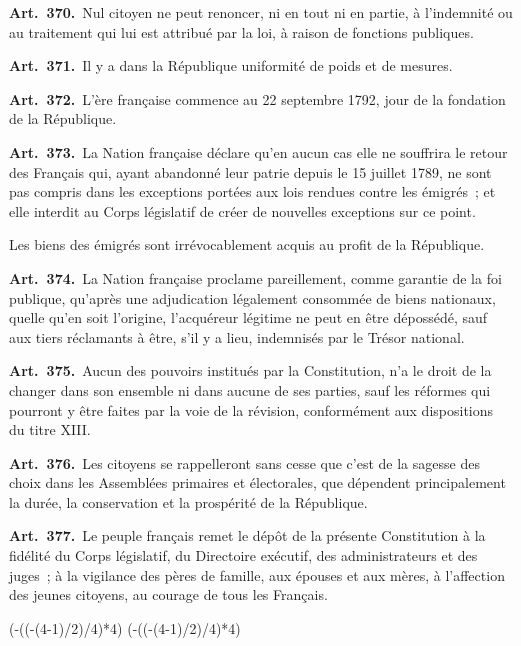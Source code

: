\documentclass[french,twoside]{book} %
\newcommand{\labelchar}[1]{\textbf{\color{rubric} #1}}
\newcommand\chapterclose{} %
\def\truncdiv#1#2{((#1-(#2-1)/2)/#2)}
\def\moduloop#1#2{(#1-\truncdiv{#1}{#2}*#2)}
\def\modulo#1#2{\number\numexpr\moduloop{#1}{#2}\relax}
\begin{document}
\labelchar{Art. 370.} Nul citoyen ne peut renoncer, ni en tout ni en partie, à l’indemnité ou au traitement qui lui est attribué par la loi, à raison de fonctions publiques.\par
\labelchar{Art. 371.} Il y a dans la République uniformité de poids et de mesures.\par
\labelchar{Art. 372.} L’ère française commence au 22 septembre 1792, jour de la fondation de la République.\par
\labelchar{Art. 373.} La Nation française déclare qu’en aucun cas elle ne souffrira le retour des Français qui, ayant abandonné leur patrie depuis le 15 juillet 1789, ne sont pas compris dans les exceptions portées aux lois rendues contre les émigrés ; et elle interdit au Corps législatif de créer de nouvelles exceptions sur ce point.\par
Les biens des émigrés sont irrévocablement acquis au profit de la République.\par
\labelchar{Art. 374.} La Nation française proclame pareillement, comme garantie de la foi publique, qu’après une adjudication légalement consommée de biens nationaux, quelle qu’en soit l’origine, l’acquéreur légitime ne peut en être dépossédé, sauf aux tiers réclamants à être, s’il y a lieu, indemnisés par le Trésor national.\par
\labelchar{Art. 375.} Aucun des pouvoirs institués par la Constitution, n’a le droit de la changer dans son ensemble ni dans aucune de ses parties, sauf les réformes qui pourront y être faites par la voie de la révision, conformément aux dispositions du titre XIII.\par
\labelchar{Art. 376.} Les citoyens se rappelleront sans cesse que c’est de la sagesse des choix dans les Assemblées primaires et électorales, que dépendent principalement la durée, la conservation et la prospérité de la République.\par
\labelchar{Art. 377.} Le peuple français remet le dépôt de la présente Constitution à la fidélité du Corps législatif, du Directoire exécutif, des administrateurs et des juges ; à la vigilance des pères de famille, aux épouses et aux mères, à l’affection des jeunes citoyens, au courage de tous les Français.
\chapterclose

 


\ifbooklet
  \pagestyle{empty}
  \clearpage
  \ifnum\modulo{\value{page}}{4}=0 \hbox{}\newpage\hbox{}\newpage\fi
  \ifnum\modulo{\value{page}}{4}=1 \hbox{}\newpage\hbox{}\newpage\fi
\end{document}

